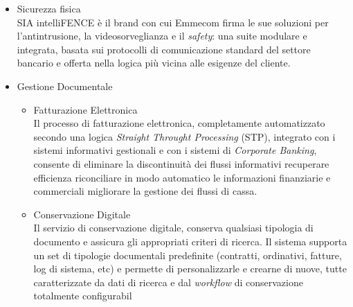\begin{itemize}
    \item Sicurezza fisica \\
    SIA intelliFENCE è il brand con cui Emmecom firma le sue soluzioni per l’antintrusione, la videosorveglianza e il \textit{safety}: una suite modulare e integrata, basata sui protocolli di comunicazione standard del settore bancario e offerta nella logica più vicina alle esigenze del cliente.
    
    \item Gestione Documentale
    \begin{itemize}
        \item Fatturazione Elettronica \\
        Il processo di fatturazione elettronica, completamente automatizzato secondo una logica \textit{Straight Throught Processing} (STP), integrato con i sistemi informativi gestionali e con i sistemi di \textit{Corporate Banking}, consente di eliminare la discontinuità dei flussi informativi recuperare efficienza riconciliare in modo automatico le informazioni finanziarie e commerciali migliorare la gestione dei flussi di cassa.
        
        \item Conservazione Digitale \\
        Il servizio di conservazione digitale, conserva qualsiasi tipologia di documento e assicura gli appropriati criteri di ricerca. Il sistema supporta un set di tipologie documentali predefinite (contratti, ordinativi, fatture, log di sistema, etc) e permette di personalizzarle e crearne di nuove, tutte caratterizzate da dati di ricerca e dal \textit{workflow} di conservazione totalmente configurabil
    \end{itemize}
\end{itemize}


















